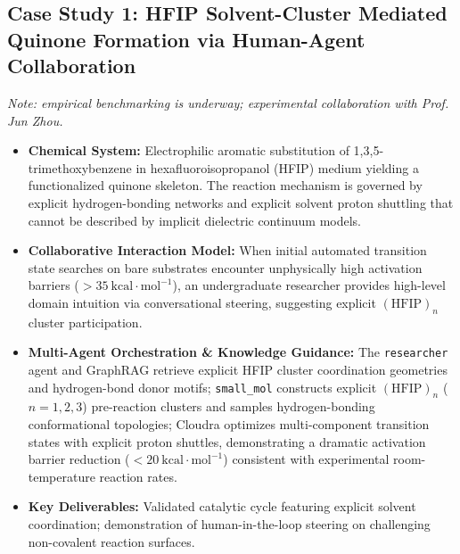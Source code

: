 \documentclass[10pt,twocolumn,letterpaper]{article}
\begin{document}
\subsection{Case Study 1: HFIP Solvent-Cluster Mediated Quinone Formation via Human-Agent Collaboration}
\textit{Note: empirical benchmarking is underway; experimental collaboration with Prof. Jun Zhou.}
\begin{itemize}[leftmargin=*]
\item \textbf{Chemical System:} Electrophilic aromatic substitution of 1,3,5-trimethoxybenzene in hexafluoroisopropanol (HFIP) medium yielding a functionalized quinone skeleton. The reaction mechanism is governed by explicit hydrogen-bonding networks and explicit solvent proton shuttling that cannot be described by implicit dielectric continuum models.
\item \textbf{Collaborative Interaction Model:} When initial automated transition state searches on bare substrates encounter unphysically high activation barriers ($>35\ \mathrm{kcal\cdot mol^{-1}}$), an undergraduate researcher provides high-level domain intuition via conversational steering, suggesting explicit $(\mathrm{HFIP})_n$ cluster participation.
\item \textbf{Multi-Agent Orchestration \& Knowledge Guidance:} The \texttt{researcher} agent and GraphRAG retrieve explicit HFIP cluster coordination geometries and hydrogen-bond donor motifs; \texttt{small\_mol} constructs explicit $(\mathrm{HFIP})_n$ ($n=1,2,3$) pre-reaction clusters and samples hydrogen-bonding conformational topologies; Cloudra optimizes multi-component transition states with explicit proton shuttles, demonstrating a dramatic activation barrier reduction ($<20\ \mathrm{kcal\cdot mol^{-1}}$) consistent with experimental room-temperature reaction rates.
\item \textbf{Key Deliverables:} Validated catalytic cycle featuring explicit solvent coordination; demonstration of human-in-the-loop steering on challenging non-covalent reaction surfaces.
\end{itemize}
\end{document}
